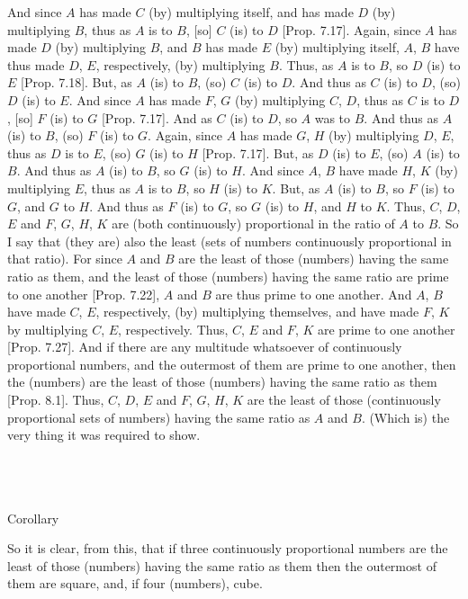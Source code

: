 \begin{Parallel}{}{}
{And since $A$ has made $C$ (by) multiplying itself, and has made $D$ (by)
multiplying $B$, thus as $A$ is to $B$, [so] $C$ (is) to $D$ [Prop. 7.17]. Again, since $A$ has made $D$
(by) multiplying $B$, and $B$ has made $E$ (by) multiplying itself,
 $A$, $B$ have thus made  $D$, $E$, respectively, (by)
multiplying $B$.  Thus, as $A$ is to $B$, so $D$ (is) to $E$ [Prop. 7.18]. But, as $A$ (is) to $B$, (so)
$C$ (is) to $D$. And thus as $C$ (is) to $D$, (so) $D$ (is) to $E$.
And since $A$ has made $F$, $G$ (by) multiplying $C$, $D$, thus as $C$ is to $D$, [so] $F$ (is) to $G$ [Prop. 7.17]. And as $C$ (is) to $D$, so
$A$ was to $B$. And thus as $A$ (is) to $B$, (so) $F$ (is) to $G$. Again,
since $A$ has made $G$, $H$ (by) multiplying $D$, $E$, thus as $D$ is to $E$, (so) $G$ (is) to $H$ [Prop. 7.17]. But, as $D$ (is) to $E$, (so) $A$ (is)
to $B$.  And thus as $A$ (is) to $B$, so $G$ (is) to $H$. And since
$A$, $B$ have made $H$, $K$ (by) multiplying
$E$, thus as $A$ is to $B$, so $H$ (is) to $K$. But, as $A$ (is) to $B$, so
$F$ (is) to $G$, and $G$ to $H$.  And thus as $F$ (is) to $G$, so $G$ (is)
to $H$, and $H$ to $K$. Thus, $C$, $D$, $E$ and $F$, $G$, $H$, $K$
are (both continuously) proportional in the ratio of $A$ to $B$. So I
say that (they are) also the least (sets of numbers continuously proportional in that
ratio). For since $A$ and $B$ are the least of those (numbers) having the
same ratio as them, and the least of those (numbers) having the same
ratio are prime to one another [Prop. 7.22],
$A$ and $B$ are thus prime to one another. And  $A$, $B$
have  made  $C$, $E$, respectively, (by) multiplying themselves, and have made $F$, $K$ by multiplying $C$, $E$, respectively. Thus,
$C$, $E$ and $F$, $K$ are prime to one another [Prop. 7.27]. And if there are any multitude whatsoever of continuously  proportional numbers, and the outermost
of them are prime to one another,  then the (numbers)  are the least of those
(numbers) having the same ratio as them [Prop. 8.1].
Thus, $C$, $D$, $E$ and $F$, $G$, $H$, $K$ are the least of those
(continuously proportional sets of numbers) having the same ratio as $A$ and $B$. (Which is) the very thing it was required to show.\\~\\~\\~\\

\begin{center}
{\large Corollary}
\end{center}\vspace*{-7pt}

So  it is clear, from this,  that if three continuously proportional numbers are the
least of those (numbers) having the same ratio as them then the outermost
of them are square, and, if four (numbers), cube.}
\end{Parallel}

